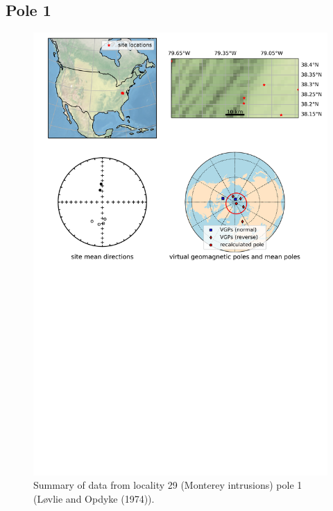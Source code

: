 \subsection{Pole 1}


\begin{figure}[H]
\centering
\includegraphics[width=5 in]{./29/1/pole_summary.png}
\caption{Summary of data from locality 29 (Monterey intrusions) pole 1 (Løvlie and Opdyke (1974)).}
\end{figure}

